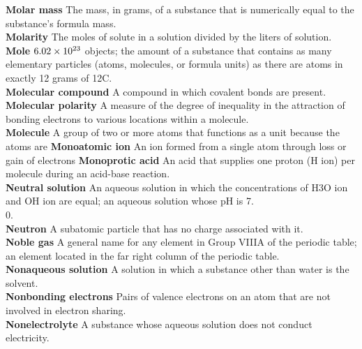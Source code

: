 \documentclass[10pt, roman]{article}
\begin{document}
\noindent \begin{minipage}[c]{0.30\textwidth}
\textbf{Molar mass} The mass, in grams, of a substance that is numerically equal to the substance’s formula mass. \\
\textbf{Molarity} The moles of solute in a solution divided by the liters of solution. \\
\textbf{Mole} $6. \\02 \times 10^{23}$ objects; the amount of a substance that contains as many elementary particles (atoms, molecules, or formula units) as there are atoms in exactly 12 grams of 12C. \\
\textbf{Molecular compound} A compound in which covalent bonds are present. \\
\textbf{Molecular polarity} A measure of the degree of inequality in the attraction of bonding electrons to various locations within a molecule. \\
\textbf{Molecule} A group of two or more atoms that functions as a unit because the atoms are 
\textbf{Monoatomic ion} An ion formed from a single atom through loss or gain of electrons
\textbf{Monoprotic acid} An acid that supplies one proton (H ion) per molecule during an acid-base reaction. \\
\textbf{Neutral solution} An aqueous solution in which the concentrations of H3O ion and OH ion are equal; an aqueous solution whose pH is 7. \\0. \\
\textbf{Neutron} A subatomic particle that has no charge associated with it. \\
\textbf{Noble gas} A general name for any element in Group VIIIA of the periodic table; an element located in the far right column of the periodic table. \\
\textbf{Nonaqueous solution} A solution in which a substance other than water is the solvent. \\
\textbf{Nonbonding electrons} Pairs of valence electrons on an atom that are not involved in electron sharing. \\
\textbf{Nonelectrolyte} A substance whose aqueous solution does not conduct electricity. \\
\end{minipage}%
\hfill
\end{document}

